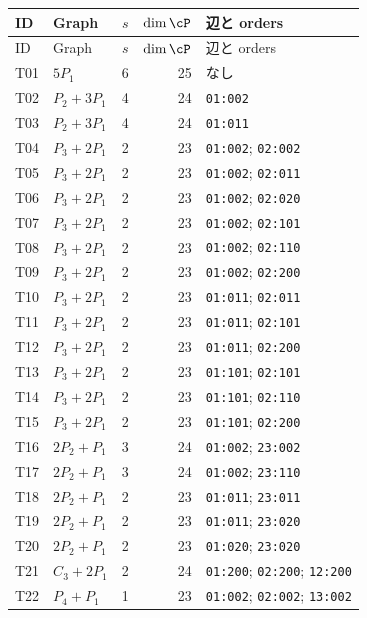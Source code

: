 \begingroup\footnotesize\setlength{\tabcolsep}{4pt}
\begin{longtable}{llrrp{78mm}}
\toprule ID & Graph & $s$ & $\dim\cP$ & 辺と orders\\\midrule
\endfirsthead
\toprule ID & Graph & $s$ & $\dim\cP$ & 辺と orders\\\midrule
\endhead
\bottomrule\endfoot
T01 & $5P_{1}$ & 6 & 25 & なし\\
T02 & $P_{2}+3P_{1}$ & 4 & 24 & \texttt{01:002}\\
T03 & $P_{2}+3P_{1}$ & 4 & 24 & \texttt{01:011}\\
T04 & $P_{3}+2P_{1}$ & 2 & 23 & \texttt{01:002}; \texttt{02:002}\\
T05 & $P_{3}+2P_{1}$ & 2 & 23 & \texttt{01:002}; \texttt{02:011}\\
T06 & $P_{3}+2P_{1}$ & 2 & 23 & \texttt{01:002}; \texttt{02:020}\\
T07 & $P_{3}+2P_{1}$ & 2 & 23 & \texttt{01:002}; \texttt{02:101}\\
T08 & $P_{3}+2P_{1}$ & 2 & 23 & \texttt{01:002}; \texttt{02:110}\\
T09 & $P_{3}+2P_{1}$ & 2 & 23 & \texttt{01:002}; \texttt{02:200}\\
T10 & $P_{3}+2P_{1}$ & 2 & 23 & \texttt{01:011}; \texttt{02:011}\\
T11 & $P_{3}+2P_{1}$ & 2 & 23 & \texttt{01:011}; \texttt{02:101}\\
T12 & $P_{3}+2P_{1}$ & 2 & 23 & \texttt{01:011}; \texttt{02:200}\\
T13 & $P_{3}+2P_{1}$ & 2 & 23 & \texttt{01:101}; \texttt{02:101}\\
T14 & $P_{3}+2P_{1}$ & 2 & 23 & \texttt{01:101}; \texttt{02:110}\\
T15 & $P_{3}+2P_{1}$ & 2 & 23 & \texttt{01:101}; \texttt{02:200}\\
T16 & $2P_{2}+P_{1}$ & 3 & 24 & \texttt{01:002}; \texttt{23:002}\\
T17 & $2P_{2}+P_{1}$ & 3 & 24 & \texttt{01:002}; \texttt{23:110}\\
T18 & $2P_{2}+P_{1}$ & 2 & 23 & \texttt{01:011}; \texttt{23:011}\\
T19 & $2P_{2}+P_{1}$ & 2 & 23 & \texttt{01:011}; \texttt{23:020}\\
T20 & $2P_{2}+P_{1}$ & 2 & 23 & \texttt{01:020}; \texttt{23:020}\\
T21 & $C_{3}+2P_{1}$ & 2 & 24 & \texttt{01:200}; \texttt{02:200}; \texttt{12:200}\\
T22 & $P_{4}+P_{1}$ & 1 & 23 & \texttt{01:002}; \texttt{02:002}; \texttt{13:002}\\

\end{longtable}
